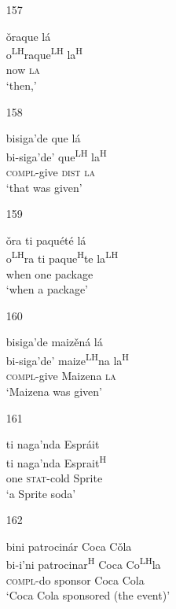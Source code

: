 \begin{itemize}
\item[157]
 
\glll   \v{o}raque l\'{a} \\
o\textsuperscript{LH}raque\textsuperscript{LH}  la\textsuperscript{H} \\
now \textsc{la}\\
\glt `then,'
 


\item[158]
 
\glll  bisiga'de que l\'{a}\\
bi-siga'de' que\textsuperscript{LH} la\textsuperscript{H}\\
\textsc{compl}-give \textsc{dist} \textsc{la}\\
\glt `that was given'
 


\item[159]
 
\glll   \v{o}ra ti paqu\'{e}t\'{e} l\'{a}\\
o\textsuperscript{LH}ra ti paque\textsuperscript{H}te la\textsuperscript{LH} \\
when one package\\
\glt `when a package'
 


\item[160]
 
\glll   bisiga'de maiz\v{e}n\'{a} l\'{a} \\
 bi-siga'de' maize\textsuperscript{LH}na la\textsuperscript{H}\\
\textsc{compl}-give Maizena \textsc{la}\\
\glt `Maizena was given'
 


\item[161]
 
\glll  ti naga'nda Espr\'{a}it \\
ti naga'nda Esprait\textsuperscript{H}\\
one \textsc{stat}-cold Sprite\\
\glt `a Sprite soda'
 


\item[162]
 
\glll  bini patrocin\'{a}r Coca C\v{o}la\\
bi-i'ni patrocinar\textsuperscript{H} Coca Co\textsuperscript{LH}la\\
\textsc{compl}-do sponsor Coca Cola\\
\glt `Coca Cola sponsored (the event)'
 



\end{itemize}

